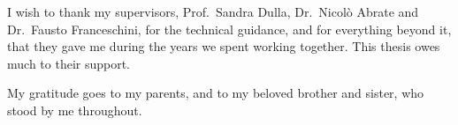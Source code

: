 
\begin{acknowledgements}

I wish to thank my supervisors, Prof.\ Sandra Dulla, Dr.\ Nicol\`o Abrate and
Dr.\ Fausto Franceschini, for the technical guidance, and for everything beyond
it, that they gave me during the years we spent working together. This thesis
owes much to their support.

My gratitude goes to my parents, and to my beloved brother and sister, who
stood by me throughout.

\end{acknowledgements}
